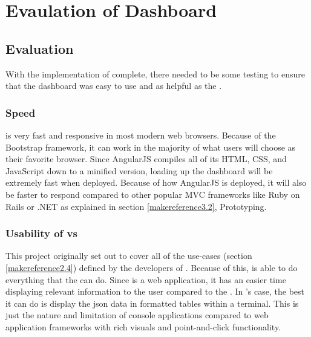 
\cleardoublepage

\chapter{Evaulation of Dashboard}
\label{makereference4}

\section{\projectName{} Evaluation}
\label{makereference4.1}

With the implementation of \projectName{} complete, there needed to be some testing to ensure that the dashboard was easy to use and as helpful as the \ancorcli{}.

\subsection{Speed}

\projectName{} is very fast and responsive in most modern web browsers. Because of the Bootstrap framework, it can work in the majority of what users will choose as their favorite browser. Since AngularJS compiles all of its HTML, CSS, and JavaScript down to a minified version, loading up the dashboard will be extremely fast when deployed. Because of how AngularJS is deployed, it will also be faster to respond compared to other popular MVC frameworks like Ruby on Rails or .NET as explained in section \ref{makereference3.2}, Prototyping.

\subsection{Usability of \projectName{} vs \ancorcli{}}

This project originally set out to cover all of the use-cases (section \ref{makereference2.4}) defined by the developers of \ancorcli{}. Because of this, \projectName{} is able to do everything that the \ancorcli{} can do. Since \projectName{} is a web application, it has an easier time displaying relevant information to the user compared to the \ancorcli{}. In \ancorcli{}'s case, the best it can do is display the json data in formatted tables within a terminal. This is just the nature and limitation of console applications compared to web application frameworks with rich visuals and point-and-click functionality.

